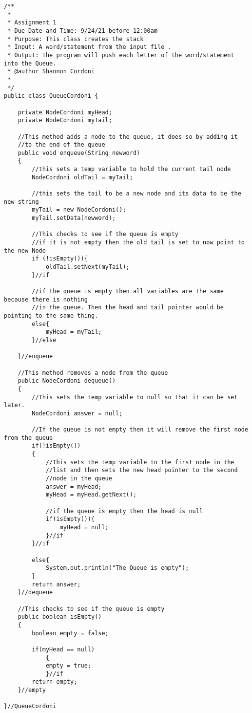 \documentclass[letterpaper, 10pt,DIV=13]{scrartcl}
\numberwithin{equation}{section} %
\numberwithin{figure}{section} %
\numberwithin{table}{section} %
\begin{document}
\lstset{numbers=left, numberstyle=\tiny, stepnumber=1, numbersep=5pt, basicstyle=\footnotesize\ttfamily}
\begin{lstlisting}[frame=single, ] 
/** 
 * 
 * Assignment 1 
 * Due Date and Time: 9/24/21 before 12:00am 
 * Purpose: This class creates the stack 
 * Input: A word/statement from the input file .
 * Output: The program will push each letter of the word/statement into the Queue. 
 * @author Shannon Cordoni 
 * 
 */
public class QueueCordoni {

	private NodeCordoni myHead;
	private NodeCordoni myTail;
	
	//This method adds a node to the queue, it does so by adding it 
	//to the end of the queue
	public void enqueue(String newword)
	{	
		//this sets a temp variable to hold the current tail node
		NodeCordoni oldTail = myTail;

		//this sets the tail to be a new node and its data to be the new string
		myTail = new NodeCordoni();
		myTail.setData(newword);
		
		//This checks to see if the queue is empty
		//if it is not empty then the old tail is set to now point to the new Node
		if (!isEmpty()){
			oldTail.setNext(myTail);		
		}//if

		//if the queue is empty then all variables are the same because there is nothing
		//in the queue. Then the head and tail pointer would be pointing to the same thing.
		else{
			myHead = myTail;
		}//else

	}//enqueue
	
	//This method removes a node from the queue
	public NodeCordoni dequeue()
	{
		//This sets the temp variable to null so that it can be set later.
		NodeCordoni answer = null;
		
		//If the queue is not empty then it will remove the first node from the queue
		if(!isEmpty())
		{
			//This sets the temp variable to the first node in the 
			//list and then sets the new head pointer to the second 
			//node in the queue
			answer = myHead;
			myHead = myHead.getNext();
			
			//if the queue is empty then the head is null 
			if(isEmpty()){
				myHead = null;
			}//if
		}//if

		else{
			System.out.println("The Queue is empty");
		}
		return answer;
	}//dequeue
	
	//This checks to see if the queue is empty
	public boolean isEmpty()
	{
		boolean empty = false;
		
		if(myHead == null)
			{
			empty = true;
			}//if
		return empty;
	}//empty
	
}//QueueCordoni

\end{lstlisting}
\end{document}
